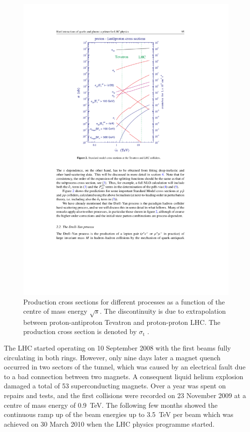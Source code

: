 \newpage
\begin{figure}[!htbp]
  \centering
  \leavevmode
  \includegraphics[width=0.8\columnwidth]{production_cross_sections}
  \caption[Production cross sections for different processes as a function of the centre of mass energy]{Production
  cross sections for different processes as a function of the centre of mass energy $\sqrt{s}$. The discontinuity is due
  to extrapolation between proton-antiproton Tevatron and proton-proton LHC. The \ttbar production cross section is
  denoted by $\sigma_\textrm{t}$ \autocite{primer_LHC}.}
  \label{fig:production_cross_sections}
\end{figure}

The LHC started operating on 10 September 2008 with the first beams fully circulating in both rings. However, only nine
days later a magnet quench occurred in two sectors of the tunnel, which was caused by an electrical fault due to a bad
connection between two magnets. A consequent liquid helium explosion damaged a total of 53 superconducting magnets. Over
a year was spent on repairs and tests, and the first collisions were recorded on 23 November 2009 at a centre of mass
energy of \SI{0.9}{\TeV}. The following few months showed the continuous ramp up of the beam energies up to
\SI{3.5}{\TeV} per beam which was achieved on 30 March 2010 when the LHC physics programme started.

